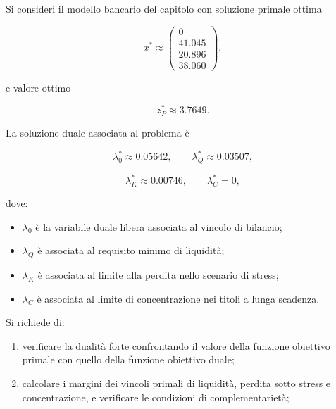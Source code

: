 \begin{exercise}

\label{ex:cap11-dualita-complementarieta}

Si consideri il modello bancario del capitolo con soluzione primale ottima

\[
x^*
\approx
\begin{pmatrix}
0\\
41.045\\
20.896\\
38.060
\end{pmatrix},
\]

\noindent e valore ottimo

\[
z_P^*
\approx
3.7649.
\]

La soluzione duale associata al problema \`e

\[
\lambda_0^*
\approx
0.05642,
\qquad
\lambda_Q^*
\approx
0.03507,
\]

\[
\lambda_K^*
\approx
0.00746,
\qquad
\lambda_C^*
=
0,
\]

\noindent dove:

\begin{itemize}

\item $\lambda_0$ \`e la variabile duale libera associata al vincolo di bilancio;

\item $\lambda_Q$ \`e associata al requisito minimo di liquidit\`a;

\item $\lambda_K$ \`e associata al limite alla perdita nello scenario di
stress;

\item $\lambda_C$ \`e associata al limite di concentrazione nei titoli a
lunga scadenza.

\end{itemize}

Si richiede di:

\begin{enumerate}

\item verificare la dualit\`a forte confrontando il valore della funzione
obiettivo primale con quello della funzione obiettivo duale;

\item calcolare i margini dei vincoli primali di liquidit\`a, perdita sotto
stress e concentrazione, e verificare le condizioni di complementariet\`a;


\end{enumerate}
\end{exercise}
